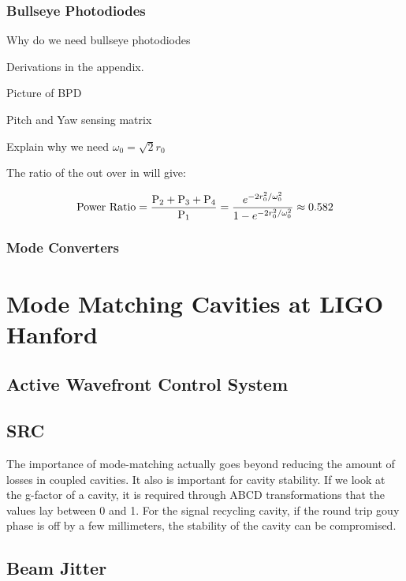 \documentclass[10pt,a4paper]{book}
\begin{document}
		\subsection{Bullseye Photodiodes}
		Why do we need bullseye photodiodes
		
		Derivations in the appendix.
		
		Picture of BPD
		
		Pitch and Yaw sensing matrix
		
		Explain why we need $\omega_{0} = \sqrt{2} r_0$
		
		The ratio of the out over in will give:
		
		\begin{equation}
		\text{Power Ratio} = \frac{\text{P}_2 + \text{P}_3 + \text{P}_4}{\text{P}_1}  \\
		= \frac{e^{-2r_0^2/ \omega_{0}^2}} {1 - e^{-2r_0^2/ \omega_{0}^2 }} \approx 0.582
		\end{equation}
		
		\subsection{Mode Converters}
		
		
		

\chapter{Mode Matching Cavities at LIGO Hanford}

	\section{Active Wavefront Control System}
	
	\section{SRC}
	The importance of mode-matching actually goes beyond reducing the amount of losses in coupled cavities.  It also is important for cavity stability.  If we look at the g-factor of a cavity, it is required through ABCD transformations that the values lay between 0 and 1.  For the signal recycling cavity, if the round trip gouy phase is off by a few millimeters, the stability of the cavity can be compromised. 
	
	
	\section{Beam Jitter}
	
\end{document}
